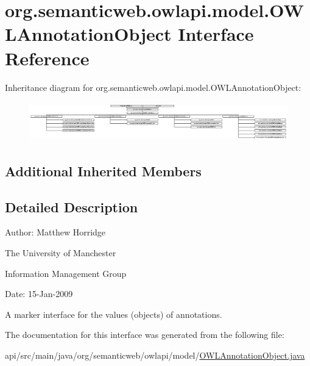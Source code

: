 \hypertarget{interfaceorg_1_1semanticweb_1_1owlapi_1_1model_1_1_o_w_l_annotation_object}{\section{org.\-semanticweb.\-owlapi.\-model.\-O\-W\-L\-Annotation\-Object Interface Reference}
\label{interfaceorg_1_1semanticweb_1_1owlapi_1_1model_1_1_o_w_l_annotation_object}
}
Inheritance diagram for org.\-semanticweb.\-owlapi.\-model.\-O\-W\-L\-Annotation\-Object\-:\begin{figure}[H]
\begin{center}
\leavevmode
\includegraphics[height=1.711491cm]{interfaceorg_1_1semanticweb_1_1owlapi_1_1model_1_1_o_w_l_annotation_object}
\end{center}
\end{figure}
\subsection*{Additional Inherited Members}


\subsection{Detailed Description}
Author\-: Matthew Horridge\par
 The University of Manchester\par
 Information Management Group\par
 Date\-: 15-\/\-Jan-\/2009 

A marker interface for the values (objects) of annotations. 

The documentation for this interface was generated from the following file\-:\begin{DoxyCompactItemize}
\item 
api/src/main/java/org/semanticweb/owlapi/model/\hyperlink{_o_w_l_annotation_object_8java}{O\-W\-L\-Annotation\-Object.\-java}\end{DoxyCompactItemize}
